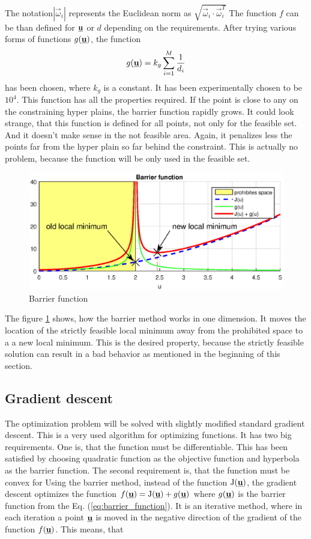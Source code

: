 \documentclass[a4paper,11pt,titlepage]{article}
\newcommand{\uvec}{\textbf{\underline{u}}}
\newcommand{\macJ}{\mathrm{J}(\uvec)}
\newcommand{\macf}{f(\uvec)}
\newcommand{\macg}{g(\uvec)}
\newcommand{\macoi}{\vec{\omega}_i}
\begin{document}
The notation$|\macoi|$ represents the Euclidean norm as $\sqrt{\macoi \cdot \macoi^T}$ The function $f$ can be than defined for $\uvec$ or $d$ depending on the requirements. After trying various forms of functions $g(\uvec)$, the function
\begin{equation}
\label{eq:barrier_function}
g(\uvec) = k_g\sum_{i = 1}^M \frac{1}{d_i} 
\end{equation}
has been chosen, where $k_g$ is a constant. It has been experimentally chosen to be $10^4$. This function has all the properties required. If the point is close to any on the constraining hyper plains, the barrier function rapidly grows. It could look strange, that this function is defined for all  points, not only for the feasible set. And it doesn't make sense in the not feasible area. Again, it penalizes less the points far from the hyper plain so far behind the constraint. This is actually no problem, because the function will be only used in the feasible set. 
\begin{figure}[h]
\begin{center}
\includegraphics[width=1.1\textwidth]{fig/barrier_function2.eps}
\caption{Barrier function}
\label{fig:barrier_function}
\end{center}
\end{figure}

The figure \ref{fig:barrier_function} shows, how the barrier method works in one dimension. It moves the location of the strictly feasible local minimum away from the prohibited space to a a new local minimum. This is the desired property, because the strictly feasible solution can result in a bad behavior as mentioned in the beginning of this section. 

\subsection{Gradient descent}
The optimization problem will be solved with slightly modified standard gradient descent. This is a very used algorithm for optimizing functions. It has two big requirements. One is, that the function must be differentiable. This has been satisfied by choosing quadratic function as the objective function and hyperbola as the barrier function. The second requirement is, that the function must be convex for Using the barrier method, instead of the function $\macJ$, the gradient descent optimizes the function $\macf = \macJ + \macg$ where $\macg$ is the barrier function from the Eq. (\ref{eq:barrier_function}). 
It is an iterative method, where in each iteration a point $\uvec$ is moved in the negative direction of the gradient of the function $f(\uvec)$. This means, that 
\end{document}
